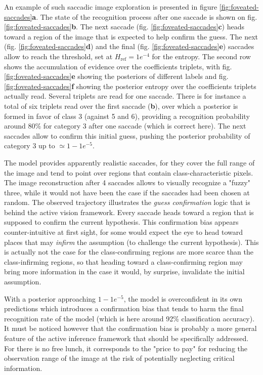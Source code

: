 \documentclass{article} %
\begin{document}
An example of such saccadic image exploration is presented in figure \ref{fig:foveated-saccades}\textbf{a}.
The state of the recognition process after one saccade is shown on fig. \ref{fig:foveated-saccades}\textbf{b}. The next saccade (fig. \ref{fig:foveated-saccades}\textbf{c})  heads toward a region of the image that is expected to help confirm the guess. The next (fig. \ref{fig:foveated-saccades}\textbf{d}) and the final  (fig. \ref{fig:foveated-saccades}\textbf{e}) saccades allow to reach the threshold, set at $H_\text{ref} = 1e^{-4}$ for the entropy. The second row shows the accumulation of evidence over the coefficients triplets, with fig. \ref{fig:foveated-saccades}\textbf{e} showing the posteriors of different labels and fig. \ref{fig:foveated-saccades}\textbf{f} showing the posterior entropy over the coefficients triplets actually read. Several triplets are read for one saccade. There is for instance a total of six triplets read over the first saccade (\textbf{b}), over which a posterior is formed in favor of class 3 (against 5 and 6), providing a recognition probability around 80\% for category 3 after one saccade (which is correct here). The next saccades allow to confirm this initial guess, pushing the posterior probability of category 3 up to $\simeq 1 - 1e^{-5}$.

The model provides apparently realistic saccades, for they cover the full range of the image and tend to point over regions that contain class-characteristic pixels. The image reconstruction after 4 saccades allows to visually recognize a "fuzzy" three, while it would not have been the case if the saccades had been chosen at random.
The observed trajectory illustrates the \emph{guess confirmation} logic that is behind the active vision framework. Every saccade heads toward a region that is supposed to confirm the current hypothesis. This confirmation bias appears counter-intuitive at first sight, for some would expect the eye to head toward places that may \emph{infirm} the assumption (to challenge the current hypothesis). This is actually not the case for the class-confirming regions are more scarce than the class-infirming regions, so that heading toward a class-confirming region may bring more information in the case it would, by surprise, invalidate the initial assumption.






With a posterior approaching $1 - 1e^{-5}$, the model is overconfident in its own predictions which introduces a confirmation bias that tends to harm the final recognition rate of the model (which is here around 92\% classification accuracy). It must be noticed however that the confirmation bias is probably a more general feature of the active inference framework that should be specifically addressed. For there is no free lunch, it corresponds to the "price to pay" for reducing the observation range of the image at the risk of potentially neglecting critical information. 
\end{document}
